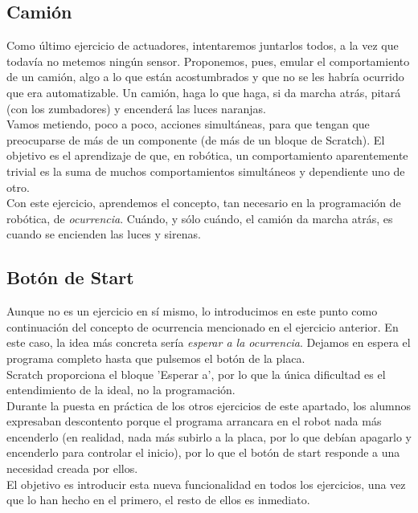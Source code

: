 \subsection{Camión}\label{camion}
Como último ejercicio de actuadores, intentaremos juntarlos todos, a la vez que todavía no metemos ningún sensor. Proponemos, pues, emular el comportamiento de un camión, algo a lo que están acostumbrados y que no se les habría ocurrido que era automatizable. Un camión, haga lo que haga, si da marcha atrás, pitará (con los zumbadores) y encenderá las luces naranjas. \\
Vamos metiendo, poco a poco, acciones simultáneas, para que tengan que preocuparse de más de un componente (de más de un bloque de Scratch). El objetivo es el aprendizaje de que, en robótica, un comportamiento aparentemente trivial es la suma de muchos comportamientos simultáneos y dependiente uno de otro.\\
Con este ejercicio, aprendemos el concepto, tan necesario en la programación de robótica, de \textit{ocurrencia}. Cuándo, y sólo cuándo, el camión da marcha atrás, es cuando se encienden las luces y sirenas.

\subsection{Botón de Start}
Aunque no es un ejercicio en sí mismo, lo introducimos en este punto como continuación del concepto de ocurrencia mencionado en el ejercicio anterior. En este caso, la idea más concreta sería \textit{esperar a la ocurrencia}. Dejamos en espera el programa completo hasta que pulsemos el botón de la placa.\\
Scratch proporciona el bloque 'Esperar a', por lo que la única dificultad es el entendimiento de la ideal, no la programación. \\
Durante la puesta en práctica de los otros ejercicios de este apartado, los alumnos expresaban descontento porque el programa arrancara en el robot nada más encenderlo (en realidad, nada más subirlo a la placa, por lo que debían apagarlo y encenderlo para controlar el inicio), por lo que el botón de start responde a una necesidad creada por ellos. \\
El objetivo es introducir esta nueva funcionalidad en todos los ejercicios, una vez que lo han hecho en el primero, el resto de ellos es inmediato.

